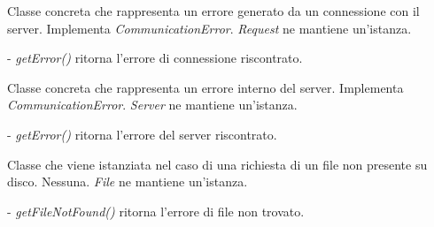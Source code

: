 Classe concreta che rappresenta un errore generato da un connessione con il server.
Implementa \textit{CommunicationError}.
\textit{Request} ne mantiene un'istanza.
\begin{elencopuntato}[\subsubsecindent]
\item[-] \textit{getError()} ritorna l'errore di connessione riscontrato.
\end{elencopuntato}

Classe concreta che rappresenta un errore interno del server.
Implementa \textit{CommunicationError}.
\textit{Server} ne mantiene un'istanza.
\begin{elencopuntato}[\subsubsecindent]
\item[-] \textit{getError()} ritorna l'errore del server riscontrato.
\end{elencopuntato}


Classe che viene istanziata nel caso di una richiesta di un file non presente su disco.
Nessuna.
\textit{File} ne mantiene un'istanza.
\begin{elencopuntato}[\subsubsecindent]
\item[-] \textit{getFileNotFound()} ritorna l'errore di file non trovato.
\end{elencopuntato}





